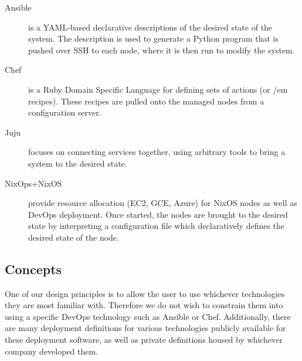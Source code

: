 \documentclass[9pt,twocolumn,twoside]{styles/osajnl}
\begin{document}
\begin{description}

\item[Ansible] is a YAML-based declarative descriptions of the desired
  state of the system. The description is used to generate a Python
  program that is pushed over SSH to each node, where it is then run
  to modify the system.

\item[Chef] is a Ruby Domain Specific Language for defining sets of
  actions (or {/em recipes}). These recipes are pulled onto the
  managed nodes from a configuration server.

\item[Juju] focuses on connecting services together, using arbitrary
  tools to bring a system to the desired state.

\item[NixOps+NixOS] provide resource allocation (EC2, GCE, Azure) for
  NixOS nodes as well as DevOps deployment. Once started, the nodes
  are brought to the desired state by interpreting a configuration
  file which declaratively defines the desired state of the node.

\end{description}


\subsection{Concepts}

One of our design principles is to allow the user to use whichever
technologies they are most familiar with. Therefore we do not wish to
constrain them into using a specific DevOps technology such as Ansible
or Chef. Additionally, there are many deployment definitions for
various technologies publicly available for these deployment
software, as well as private definitions housed by whichever company
developed them.
\end{document}
